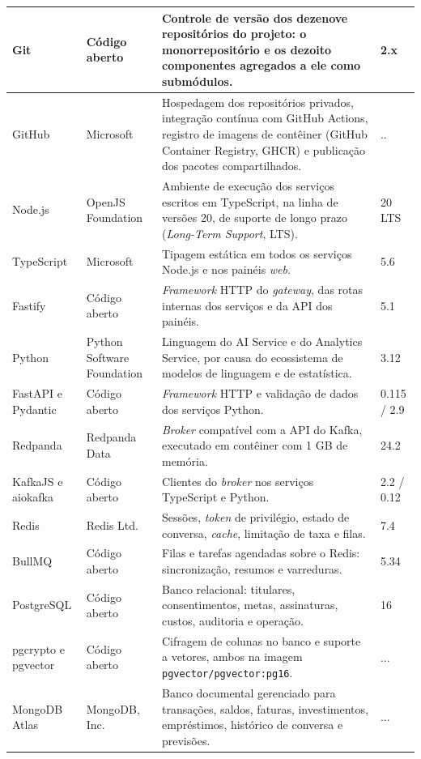 {\begin{longtable}{|L{3.2cm}|L{2.8cm}|L{6.7cm}|L{1.5cm}|}
Git & Código aberto & Controle de versão dos dezenove repositórios do projeto: o monorrepositório e os dezoito componentes agregados a ele como submódulos. & 2.x \\ \hline
GitHub & Microsoft & Hospedagem dos repositórios privados, integração contínua com GitHub Actions, registro de imagens de contêiner (GitHub Container Registry, GHCR) e publicação dos pacotes compartilhados. & .. \\ \hline
Node.js & OpenJS Foundation & Ambiente de execução dos serviços escritos em TypeScript, na linha de versões 20, de suporte de longo prazo (\textit{Long-Term Support}, LTS). & 20 LTS \\ \hline
TypeScript & Microsoft & Tipagem estática em todos os serviços Node.js e nos painéis \textit{web}. & 5.6 \\ \hline
Fastify & Código aberto & \textit{Framework} HTTP do \textit{gateway}, das rotas internas dos serviços e da API dos painéis. & 5.1 \\ \hline
Python & Python Software Foundation & Linguagem do AI Service e do Analytics Service, por causa do ecossistema de modelos de linguagem e de estatística. & 3.12 \\ \hline
FastAPI e Pydantic & Código aberto & \textit{Framework} HTTP e validação de dados dos serviços Python. & 0.115 / 2.9 \\ \hline
Redpanda & Redpanda Data & \textit{Broker} compatível com a API do Kafka, executado em contêiner com 1 GB de memória. & 24.2 \\ \hline
KafkaJS e aiokafka & Código aberto & Clientes do \textit{broker} nos serviços TypeScript e Python. & 2.2 / 0.12 \\ \hline
Redis & Redis Ltd. & Sessões, \textit{token} de privilégio, estado de conversa, \textit{cache}, limitação de taxa e filas. & 7.4 \\ \hline
BullMQ & Código aberto & Filas e tarefas agendadas sobre o Redis: sincronização, resumos e varreduras. & 5.34 \\ \hline
PostgreSQL & Código aberto & Banco relacional: titulares, consentimentos, metas, assinaturas, custos, auditoria e operação. & 16 \\ \hline
pgcrypto e pgvector & Código aberto & Cifragem de colunas no banco e suporte a vetores, ambos na imagem \texttt{pgvector/pgvector:pg16}. & ... \\ \hline
MongoDB Atlas & MongoDB, Inc. & Banco documental gerenciado para transações, saldos, faturas, investimentos, empréstimos, histórico de conversa e previsões. & ... \\ \hline

\end{longtable}}
